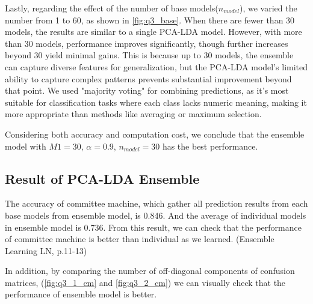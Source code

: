 Lastly, regarding the effect of the number of base models($n_{model}$), we varied the number from 1 to 60, as shown in \cref{fig:q3_base}. When there are fewer than 30 models, the results are similar to a single PCA-LDA model. However, with more than 30 models, performance improves significantly, though further increases beyond 30 yield minimal gains. This is because up to 30 models, the ensemble can capture diverse features for generalization, but the PCA-LDA model’s limited ability to capture complex patterns prevents substantial improvement beyond that point. We used "majority voting" for combining predictions, as it’s most suitable for classification tasks where each class lacks numeric meaning, making it more appropriate than methods like averaging or maximum selection.

Considering both accuracy and computation cost, we conclude that the ensemble model with $M1=30$, $\alpha=0.9$, $n_{model}=30$ has the best performance.



\subsection{Result of PCA-LDA Ensemble}
The accuracy of committee machine, which gather all prediction results from each base models from ensemble model, is 0.846. And the average of individual models in ensemble model is 0.736. From this result, we can check that the performance of committee machine is better than individual as we learned. (Ensemble Learning LN, p.11-13)

In addition, by comparing the number of off-diagonal components of confusion matrices, (\cref{fig:q3_1_cm} and \cref{fig:q3_2_cm}) we can visually check that the performance of ensemble model is better.
